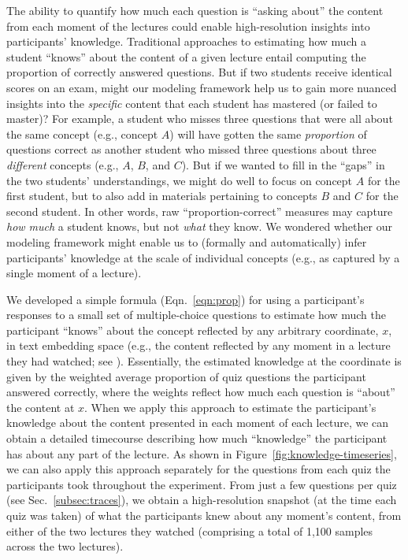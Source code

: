 \documentclass[10pt]{article}
\renewcommand{\nameref}[1]{\mbox{\textit{\oldnameref{#1}}}}
\begin{document}
The ability to quantify how much each question is ``asking about'' the content
from each moment of the lectures could enable high-resolution insights into
participants' knowledge. Traditional approaches to estimating how much a
student ``knows'' about the content of a given lecture entail computing the
proportion of correctly answered questions. But if two students receive
identical scores on an exam, might our modeling framework help us to gain more
nuanced insights into the \textit{specific} content that each student has
mastered (or failed to master)? For example, a student who misses three
questions that were all about the same concept (e.g., concept $A$) will have
gotten the same \textit{proportion} of questions correct as another student who
missed three questions about three \textit{different} concepts (e.g., $A$, $B$,
and $C$). But if we wanted to fill in the ``gaps'' in the two students'
understandings, we might do well to focus on concept $A$ for the first student,
but to also add in materials pertaining to concepts $B$ and $C$ for the second
student. In other words, raw ``proportion-correct'' measures may capture
\textit{how much} a student knows, but not \textit{what} they know. We wondered
whether our modeling framework might enable us to (formally and automatically)
infer participants' knowledge at the scale of individual concepts (e.g., as
captured by a single moment of a lecture).

We developed a simple formula (Eqn.~\ref{eqn:prop}) for using a participant's
responses to a small set of multiple-choice questions to estimate how much the
participant ``knows'' about the concept reflected by any arbitrary coordinate,
$x$, in text embedding space (e.g., the content reflected by any moment in a
lecture they had watched; see \nameref{subsec:traces}). Essentially, the
estimated knowledge at the coordinate is given by the weighted average
proportion of quiz questions the participant answered correctly, where the
weights reflect how much each question is ``about'' the content at $x$. When we
apply this approach to estimate the participant's knowledge about the content
presented in each moment of each lecture, we can obtain a detailed timecourse
describing how much ``knowledge'' the participant has about any part of the
lecture. As shown in Figure~\ref{fig:knowledge-timeseries}, we can also apply
this approach separately for the questions from each quiz the participants took
throughout the experiment. From just a few questions per quiz (see Sec.~\ref{subsec:traces}), we obtain a
high-resolution snapshot (at the time each quiz was taken) of what the
participants knew about any moment's content, from either of the two lectures
they watched (comprising a total of 1,100 samples across the two lectures).
\end{document}
